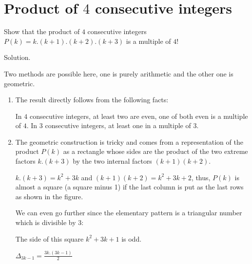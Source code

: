 \documentclass{article}[12pt]
\begin{document}
\section{Product of $4$ consecutive integers}

Show that the product of $4$ consecutive integers $P(k) = k.(k+1).(k+2).(k+3)$
is a multiple of $4!$
\bigskip

Solution.

Two methods are possible here, one is purely arithmetic and the other one is geometric.

\begin{enumerate}
\item The result directly follows from the following facts:

In $4$ consecutive integers, at least two are even, one of both even is a multiple of $4$.
In $3$ consecutive integers, at least one in a multiple of $3$.
\item
The geometric construction is tricky and comes from a representation of the product $P(k)$ as a rectangle whose sides are the product of the two extreme factors 
$k.(k+3)$ by the two internal factors $(k+1)(k+2)$.

$k.(k+3) = k^2 + 3k$ and $(k+1)(k+2) = k^2 + 3k +2$, thus, $P(k)$ is almost a square (a square minus 1)
if the last column is put as the last rows as shown in the figure.

We can even go further since the elementary pattern is a triangular number which is divisible by $3$:

The side of this square
$k^2+3k+1$ is odd. 

$\Delta_{3k-1} = \frac{3k.(3k-1)}{2}$
\end{enumerate}
\end{document}
